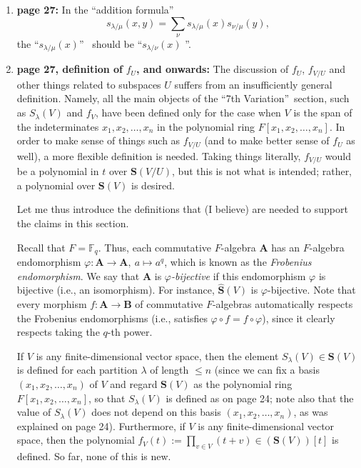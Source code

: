 \documentclass[numbers=enddot,12pt,final,onecolumn,notitlepage]{scrartcl}%
\theoremstyle{definition}
\let\sumnonlimits\sum
\let\prodnonlimits\prod
\renewcommand{\sum}{\sumnonlimits\limits}
\renewcommand{\prod}{\prodnonlimits\limits}
\begin{document}
\begin{enumerate}
\item \textbf{page 27:} In the \textquotedblleft addition
formula\textquotedblright%
\[
s_{\lambda/\mu}\left(  x,y\right)  =\sum_{\nu}s_{\lambda/\mu}\left(  x\right)
s_{\nu/\mu}\left(  y\right)  ,
\]
the \textquotedblleft$s_{\lambda/\mu}\left(  x\right)  $\textquotedblright%
\ should be \textquotedblleft$s_{\lambda/\nu}\left(  x\right)  $%
\textquotedblright.

\item \textbf{page 27, definition of }$f_{U}$\textbf{, and onwards:} The
discussion of $f_{U}$, $f_{V/U}$ and other things related to subspaces $U$
suffers from an insufficiently general definition. Namely, all the main
objects of the \textquotedblleft7th Variation\textquotedblright\ section, such
as $S_{\lambda}\left(  V\right)  $ and $f_{V}$, have been defined only for the
case when $V$ is the span of the indeterminates $x_{1},x_{2},\ldots,x_{n}$ in
the polynomial ring $F\left[  x_{1},x_{2},\ldots,x_{n}\right]  $. In order to
make sense of things such as $f_{V/U}$ (and to make better sense of $f_{U}$ as
well), a more flexible definition is needed. Taking things literally,
$f_{V/U}$ would be a polynomial in $t$ over $\mathbf{S}\left(  V/U\right)  $,
but this is not what is intended; rather, a polynomial over $\mathbf{S}\left(
V\right)  $ is desired.

Let me thus introduce the definitions that (I believe) are needed to support
the claims in this section.

Recall that $F=\mathbb{F}_{q}$. Thus, each commutative $F$-algebra
$\mathbf{A}$ has an $F$-algebra endomorphism $\varphi:\mathbf{A}%
\rightarrow\mathbf{A},\ a\mapsto a^{q}$, which is known as the \emph{Frobenius
endomorphism}. We say that $\mathbf{A}$ is $\varphi$\emph{-bijective} if this
endomorphism $\varphi$ is bijective (i.e., an isomorphism). For instance,
$\widehat{\mathbf{S}}\left(  V\right)  $ is $\varphi$-bijective. Note that
every morphism $f:\mathbf{A}\rightarrow\mathbf{B}$ of commutative $F$-algebras
automatically respects the Frobenius endomorphisms (i.e., satisfies
$\varphi\circ f=f\circ\varphi$), since it clearly respects taking the $q$-th power.

If $V$ is any finite-dimensional vector space, then the element $S_{\lambda
}\left(  V\right)  \in\mathbf{S}\left(  V\right)  $ is defined for each
partition $\lambda$ of length $\leq n$ (since we can fix a basis $\left(
x_{1},x_{2},\ldots,x_{n}\right)  $ of $V$ and regard $\mathbf{S}\left(
V\right)  $ as the polynomial ring $F\left[  x_{1},x_{2},\ldots,x_{n}\right]
$, so that $S_{\lambda}\left(  V\right)  $ is defined as on page 24; note also
that the value of $S_{\lambda}\left(  V\right)  $ does not depend on this
basis $\left(  x_{1},x_{2},\ldots,x_{n}\right)  $, as was explained on page
24). Furthermore, if $V$ is any finite-dimensional vector space, then the
polynomial $f_{V}\left(  t\right)  :=\prod_{v\in V}\left(  t+v\right)
\in\left(  \mathbf{S}\left(  V\right)  \right)  \left[  t\right]  $ is
defined. So far, none of this is new.


\end{enumerate}
\end{document}
